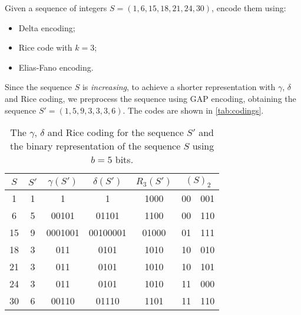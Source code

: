 \exercise

Given a sequence of integers $S = (1, 6, 15, 18, 21, 24, 30)$, encode them
using:
%
\begin{itemize}
  \item Delta encoding;
  \item Rice code with $k = 3$;
  \item Elias-Fano encoding.
\end{itemize}

\solution

Since the sequence $S$ is \emph{increasing}, to achieve a shorter representation
with $\gamma$, $\delta$ and Rice coding, we preprocess the sequence using GAP
encoding, obtaining the sequence $S' = (1, 5, 9, 3, 3, 3, 6)$. The codes are
shown in \autoref{tab:codings}.
%
\begin{table}[b]
  \centering
  \begin{tabular}{c|c||c|c|c||c|c}
    $S$ & $S'$ & $\gamma(S')$ & $\delta(S')$ & $R_3(S')$ & \multicolumn{2}{c}{$(S)_2$} \\\hline
    1  & 1 & 1       & 1        & 1000  & 00 & 001 \\
    6  & 5 & 00101   & 01101    & 1100  & 00 & 110 \\
    15 & 9 & 0001001 & 00100001 & 01000 & 01 & 111 \\
    18 & 3 & 011     & 0101     & 1010  & 10 & 010 \\
    21 & 3 & 011     & 0101     & 1010  & 10 & 101 \\
    24 & 3 & 011     & 0101     & 1010  & 11 & 000 \\
    30 & 6 & 00110   & 01110    & 1101  & 11 & 110 \\
  \end{tabular}

  \caption{The $\gamma$, $\delta$ and Rice coding for the sequence $S'$ and the
  binary representation of the sequence $S$ using $b = 5$ bits.}
  \label{tab:codings}

\end{table}

